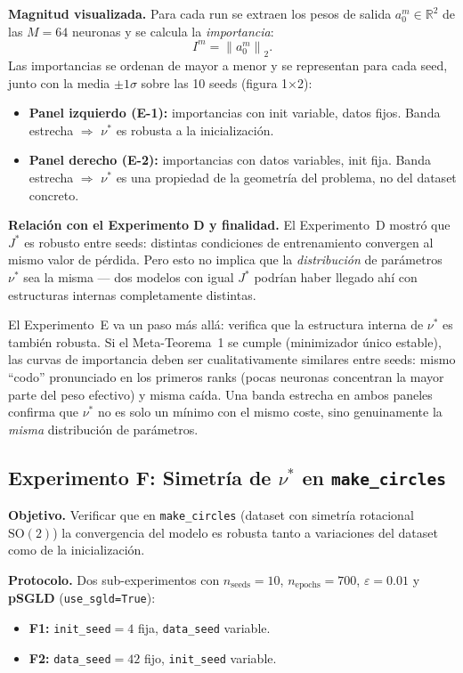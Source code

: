 \documentclass[11pt, a4paper]{article}
\theoremstyle{definition}
\newcommand{\R}{\mathbb{R}}
\newcommand{\norm}[1]{\left\|#1\right\|}
\begin{document}
\textbf{Magnitud visualizada.} Para cada run se extraen los pesos de salida
$a_0^m \in \R^2$ de las $M=64$ neuronas y se calcula la \emph{importancia}:
\begin{equation}
  I^m = \norm{a_0^m}_2.
\end{equation}
Las importancias se ordenan de mayor a menor y se representan para cada seed,
junto con la media $\pm 1\sigma$ sobre las 10 seeds (figura 1×2):
\begin{itemize}
  \item \textbf{Panel izquierdo (E-1):} importancias con init variable,
        datos fijos. Banda estrecha $\Rightarrow$ $\nu^*$ es robusta a la
        inicialización.
  \item \textbf{Panel derecho (E-2):} importancias con datos variables,
        init fija. Banda estrecha $\Rightarrow$ $\nu^*$ es una propiedad
        de la geometría del problema, no del dataset concreto.
\end{itemize}

\textbf{Relación con el Experimento D y finalidad.}
El Experimento~D mostró que $J^*$ es robusto entre seeds: distintas condiciones
de entrenamiento convergen al mismo valor de pérdida. Pero esto no implica
que la \emph{distribución} de parámetros $\nu^*$ sea la misma — dos modelos
con igual $J^*$ podrían haber llegado ahí con estructuras internas
completamente distintas.

El Experimento~E va un paso más allá: verifica que la estructura interna
de $\nu^*$ es también robusta. Si el Meta-Teorema~1 se cumple (minimizador
único estable), las curvas de importancia deben ser cualitativamente similares
entre seeds: mismo ``codo'' pronunciado en los primeros ranks (pocas neuronas
concentran la mayor parte del peso efectivo) y misma caída. Una banda estrecha
en ambos paneles confirma que $\nu^*$ no es solo un mínimo con el mismo coste,
sino genuinamente la \emph{misma} distribución de parámetros.

\subsection{Experimento F: Simetría de $\nu^*$ en \texttt{make\_circles}}

\textbf{Objetivo.} Verificar que en \texttt{make\_circles} (dataset con
simetría rotacional $\text{SO}(2)$) la convergencia del modelo es robusta
tanto a variaciones del dataset como de la inicialización.

\textbf{Protocolo.} Dos sub-experimentos con $n_\text{seeds} = 10$,
$n_\text{epochs} = 700$, $\varepsilon = 0.01$ y \textbf{pSGLD}
(\texttt{use\_sgld=True}):
\begin{itemize}
  \item \textbf{F1:} \texttt{init\_seed}$= 4$ fija, \texttt{data\_seed}
        variable.
  \item \textbf{F2:} \texttt{data\_seed}$= 42$ fijo, \texttt{init\_seed}
        variable.
\end{itemize}
\end{document}
